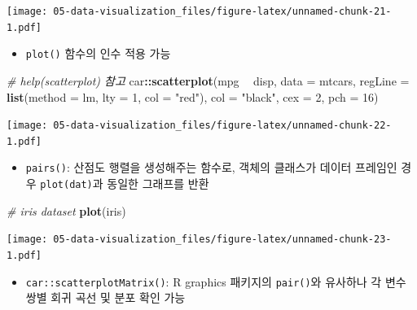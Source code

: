 \documentclass[
  11pt,
]{krantz}
\newenvironment{Shaded}{\begin{snugshade}}{\end{snugshade}}
\newcommand{\CommentTok}[1]{\textcolor[rgb]{0.37,0.37,0.37}{\textit{#1}}}
\newcommand{\DataTypeTok}[1]{\textcolor[rgb]{0.27,0.27,0.27}{#1}}
\newcommand{\DecValTok}[1]{\textcolor[rgb]{0.06,0.06,0.06}{#1}}
\newcommand{\KeywordTok}[1]{\textcolor[rgb]{0.27,0.27,0.27}{\textbf{#1}}}
\newcommand{\NormalTok}[1]{#1}
\newcommand{\OperatorTok}[1]{\textcolor[rgb]{0.43,0.43,0.43}{\textbf{#1}}}
\newcommand{\StringTok}[1]{\textcolor[rgb]{0.5,0.5,0.5}{#1}}
\providecommand{\tightlist}{%
  \setlength{\itemsep}{0pt}\setlength{\parskip}{0pt}}
\begin{document}
\texttt{[image: 05-data-visualization\_files/figure-latex/unnamed-chunk-21-1.pdf]}

\normalsize

\begin{itemize}
\tightlist
\item
  \texttt{plot()} 함수의 인수 적용 가능
\end{itemize}

\footnotesize

\begin{Shaded}
\begin{Highlighting}[]
\CommentTok{# help(scatterplot) 참고}
\NormalTok{car}\OperatorTok{::}\KeywordTok{scatterplot}\NormalTok{(mpg }\OperatorTok{~}\StringTok{ }\NormalTok{disp, }\DataTypeTok{data =}\NormalTok{ mtcars, }
                 \DataTypeTok{regLine =} \KeywordTok{list}\NormalTok{(}\DataTypeTok{method =}\NormalTok{ lm, }\DataTypeTok{lty =} \DecValTok{1}\NormalTok{, }\DataTypeTok{col =} \StringTok{"red"}\NormalTok{), }
                 \DataTypeTok{col =} \StringTok{"black"}\NormalTok{, }\DataTypeTok{cex =} \DecValTok{2}\NormalTok{, }\DataTypeTok{pch =} \DecValTok{16}\NormalTok{)}
\end{Highlighting}
\end{Shaded}

\texttt{[image: 05-data-visualization\_files/figure-latex/unnamed-chunk-22-1.pdf]}

\normalsize

\begin{itemize}
\tightlist
\item
  \texttt{pairs()}: 산점도 행렬을 생성해주는 함수로, 객체의 클래스가 데이터 프레임인 경우 \texttt{plot(dat)}과 동일한 그래프를 반환
\end{itemize}

\footnotesize

\begin{Shaded}
\begin{Highlighting}[]
\CommentTok{# iris dataset}
\KeywordTok{plot}\NormalTok{(iris)}
\end{Highlighting}
\end{Shaded}

\texttt{[image: 05-data-visualization\_files/figure-latex/unnamed-chunk-23-1.pdf]}

\normalsize

\begin{itemize}
\tightlist
\item
  \texttt{car::scatterplotMatrix()}: R graphics 패키지의 \texttt{pair()}와 유사하나 각 변수 쌍별 회귀 곡선 및 분포 확인 가능
\end{itemize}
\end{document}
